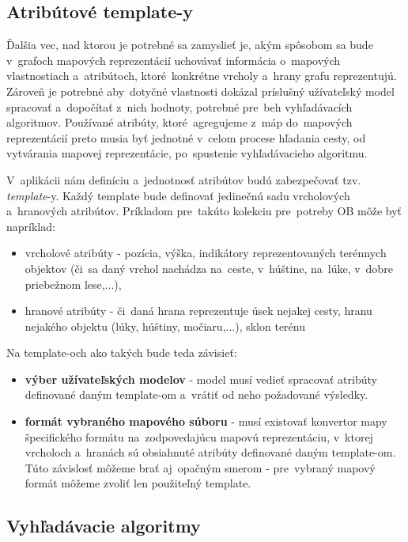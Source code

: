 \subsection{Atribútové template-y}\label{templatey}

Ďalšia vec, nad ktorou je potrebné sa zamyslieť je, akým spôsobom sa bude v~grafoch mapových reprezentácií uchovávať informácia o~mapových vlastnostiach a~atribútoch, ktoré~konkrétne vrcholy a~hrany grafu reprezentujú. Zároveň je potrebné aby~dotyčné vlastnosti dokázal príslušný užívateľský model spracovať a~dopočítať z~nich hodnoty, potrebné pre~beh vyhľadávacích algoritmov. Používané atribúty, ktoré~agregujeme z~máp do~mapových reprezentácií preto musia byť jednotné v~celom procese hľadania cesty, od vytvárania mapovej reprezentácie, po~spustenie vyhľadávacieho algoritmu.

V~aplikácii nám definíciu a~jednotnosť atribútov budú zabezpečovať tzv. \textit{template}-y. Každý template bude definovať jedinečnú sadu vrcholových a~hranových atribútov. Príkladom pre~takúto kolekciu pre~potreby OB môže byť napríklad:
\begin{itemize}
    \item vrcholové atribúty - pozícia, výška, indikátory reprezentovaných terénnych objektov (či~sa daný vrchol nachádza na~ceste, v~húštine, na~lúke, v~dobre priebežnom lese,...),
    \item hranové atribúty - či~daná hrana reprezentuje úsek nejakej cesty, hranu nejakého objektu (lúky, húštiny, močiaru,...), sklon terénu
\end{itemize}

Na template-och ako takých bude teda závisieť: 
\begin{itemize}
    \item \textbf{výber užívateľských modelov} - model musí vedieť spracovať atribúty definované daným template-om a~vrátiť od neho požadované výsledky.
    \item \textbf{formát vybraného mapového súboru} - musí existovať konvertor mapy špecifického formátu na~zodpovedajúcu mapovú reprezentáciu, v~ktorej vrcholoch a~hranách sú obsiahnuté atribúty definované daným template-om. Túto závislosť môžeme brať aj~opačným smerom - pre~vybraný mapový formát môžeme zvoliť len použiteľný template.
\end{itemize}

\subsection{Vyhľadávacie algoritmy}\label{vyhladavacie_algoritmy}

